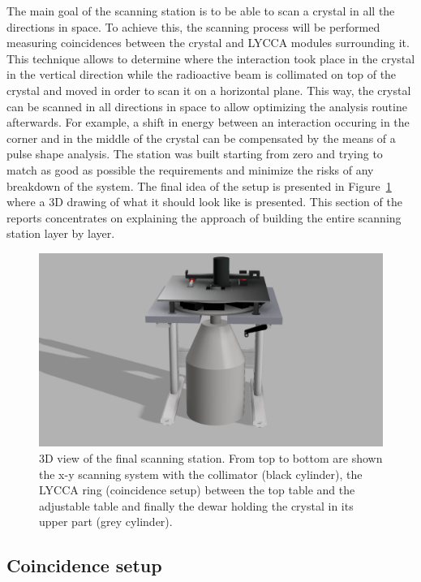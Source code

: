 \documentclass[11pt,a4paper]{article}
\begin{document}
The main goal of the scanning station is to be able to scan a crystal in all the directions in space. To achieve this, the scanning process will be performed measuring coincidences between the crystal and LYCCA \cite{LYCCA} modules surrounding it. This technique allows to determine where the interaction took place in the crystal in the vertical direction while the radioactive beam is collimated on top of the crystal and moved in order to scan it on a horizontal plane. This way, the crystal can be scanned in all directions in space to allow optimizing the analysis routine afterwards. For example, a shift in energy between an interaction occuring in the corner and in the middle of the crystal can be compensated by the means of a pulse shape analysis. The station was built starting from zero and trying to match as good as possible the requirements and minimize the risks of any breakdown of the system. The final idea of the setup is presented in Figure~\ref{3D_total} where a 3D drawing of what it should look like is presented. This section of the reports concentrates on explaining the approach of building the entire scanning station layer by layer.

\begin{figure}[!h]
\centering
\includegraphics[scale=0.2]{final_setup.png}
\caption{3D view of the final scanning station. From top to bottom are shown the x-y scanning system with the collimator (black cylinder), the LYCCA ring (coincidence setup) between the top table and the adjustable table and finally the dewar holding the crystal in its upper part (grey cylinder).}
\label{3D_total}
\end{figure}

\subsection{Coincidence setup} \label{coin_setup}
\end{document}
